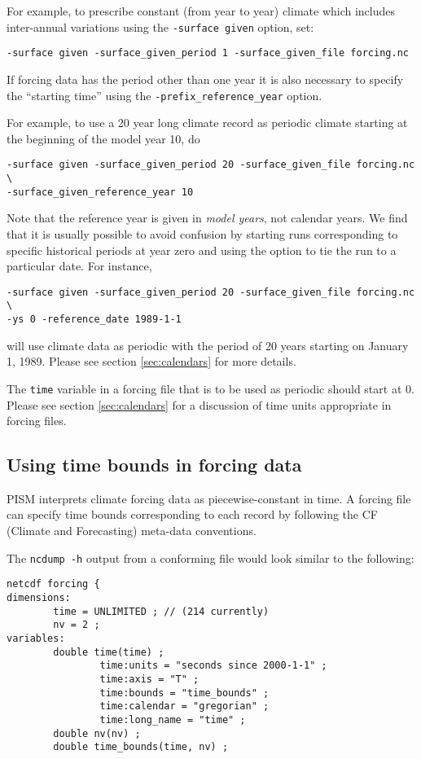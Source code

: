 \documentclass[titlepage,letterpaper,final]{scrartcl}
\begin{document}
For example, to prescribe constant (from year to year) climate which includes
inter-annual variations using the \texttt{-surface given} option, set:
\begin{verbatim}
-surface given -surface_given_period 1 -surface_given_file forcing.nc
\end{verbatim}

If forcing data has the period other than one year it is also
necessary to specify the ``starting time'' using the
\texttt{-prefix_reference_year} option.

For example, to use a 20 year long climate record as periodic climate starting
at the beginning of the model year 10, do
\begin{verbatim}
-surface given -surface_given_period 20 -surface_given_file forcing.nc \
-surface_given_reference_year 10
\end{verbatim}

Note that the reference year is given in \emph{model years}, not calendar
years. We find that it is usually possible to avoid confusion by starting runs
corresponding to specific historical periods at year zero and using the
\intextoption{reference_date} option to tie the run to a particular date. For instance,
\begin{verbatim}
-surface given -surface_given_period 20 -surface_given_file forcing.nc \
-ys 0 -reference_date 1989-1-1
\end{verbatim}
will use climate data as periodic with the period of 20 years starting on
January 1, 1989. Please see section \ref{sec:calendars} for more details.

The \texttt{time} variable in a forcing file that is to be used as periodic
should start at $0$. Please see section \ref{sec:calendars} for a discussion of time units appropriate in forcing files.

\subsection{Using time bounds in forcing data}
\label{sec:time-bounds}
\index{Time!bounds}

PISM interprets climate forcing data as piecewise-constant in time. A forcing file can specify time bounds corresponding to each record by following the CF (Climate and Forecasting) meta-data conventions.

The \texttt{ncdump -h} output from a conforming file would look similar to the
following:
\begin{verbatim}
netcdf forcing {
dimensions:
        time = UNLIMITED ; // (214 currently)
        nv = 2 ;
variables:
        double time(time) ;
                time:units = "seconds since 2000-1-1" ;
                time:axis = "T" ;
                time:bounds = "time_bounds" ;
                time:calendar = "gregorian" ;
                time:long_name = "time" ;
        double nv(nv) ;
        double time_bounds(time, nv) ;
\end{verbatim}
\end{document}
